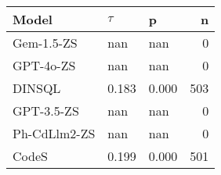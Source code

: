 \begin{tabular}{lllr}
\toprule
Model & $\tau$ & p & n \\
\midrule
Gem-1.5-ZS & nan & nan & 0 \\
GPT-4o-ZS & nan & nan & 0 \\
DINSQL & 0.183 & 0.000 & 503 \\
GPT-3.5-ZS & nan & nan & 0 \\
Ph-CdLlm2-ZS & nan & nan & 0 \\
CodeS & 0.199 & 0.000 & 501 \\
\bottomrule
\end{tabular}
